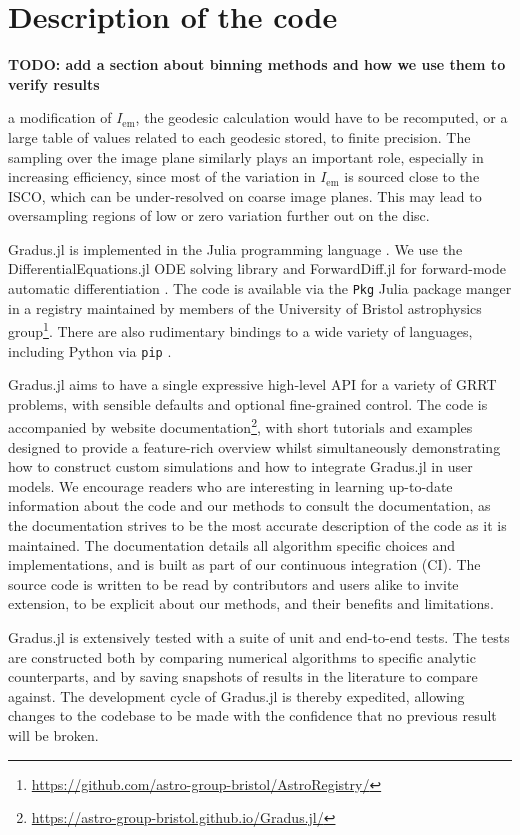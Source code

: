 \documentclass[fleqn,usenatbib]{mnras}
\newcommand{\todo}[1]{{\noindent \bf \color{red} TODO: #1}}
\newcommand{\Gradus}{Gradus.jl }
\begin{document}
\section{Description of the code}

\todo{
    add a section about binning methods and how we use them to verify results

a modification of $I_\text{em}$, the geodesic calculation
would have to be recomputed, or a large table of values related to each geodesic
stored, to finite precision. The sampling over the image plane similarly plays
an important role, especially in increasing efficiency, since most of the
variation in $I_\text{em}$ is sourced close to the ISCO, which can be
under-resolved on coarse image planes. This may lead to oversampling regions of
low or zero variation further out on the disc.
}

\Gradus is implemented in the Julia programming language \citep{Bezanson_Julia_A_fresh_2017}. We use the DifferentialEquations.jl ODE solving library and ForwardDiff.jl for forward-mode automatic differentiation \citep{RevelsLubinPapamarkou2016}. The code is available via the \texttt{Pkg} Julia package manger in a registry maintained by members of the University of Bristol astrophysics group\footnote{\url{https://github.com/astro-group-bristol/AstroRegistry/}}. There are also rudimentary bindings to a wide variety of languages, including Python via \texttt{pip} \citep{}.

\Gradus aims to have a single expressive high-level API for a variety of GRRT problems, with sensible defaults and optional fine-grained control. The code is accompanied by website documentation\footnote{\url{https://astro-group-bristol.github.io/Gradus.jl/}}, with short tutorials and examples designed to provide a feature-rich overview whilst simultaneously demonstrating how to construct custom simulations and how to integrate \Gradus in user models. We encourage readers who are interesting in learning up-to-date information about the code and our methods to consult the documentation, as the documentation strives to be the most accurate description of the code as it is maintained. The documentation details all algorithm specific choices and implementations, and is built as part of our continuous integration (CI). The source code is written to be read by contributors and users alike to invite extension, to be explicit about our methods, and their benefits and limitations.

\Gradus is extensively tested with a suite of unit and end-to-end tests. The tests are constructed both by comparing numerical algorithms to specific analytic counterparts, and by saving snapshots of results in the literature to compare against. The development cycle of \Gradus is thereby expedited, allowing changes to the codebase to be made with the confidence that no previous result will be broken.
\end{document}
